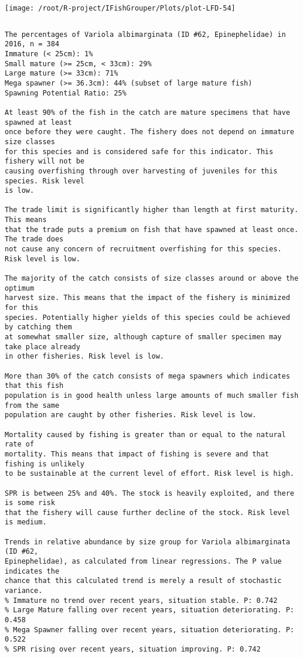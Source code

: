 \documentclass{report}\usepackage[]{graphicx}\usepackage[]{color}
\makeatletter
\def\maxwidth{ %
  \ifdim\Gin@nat@width>\linewidth
    \linewidth
  \else
    \Gin@nat@width
  \fi
}
\newenvironment{kframe}{%
 \def\at@end@of@kframe{}%
 \ifinner\ifhmode%
  \def\at@end@of@kframe{\end{minipage}}%
  \begin{minipage}{\columnwidth}%
 \fi\fi%
 \def\FrameCommand##1{\hskip\@totalleftmargin \hskip-\fboxsep
 \colorbox{shadecolor}{##1}\hskip-\fboxsep
     \hskip-\linewidth \hskip-\@totalleftmargin \hskip\columnwidth}%
 \MakeFramed {\advance\hsize-\width
   \@totalleftmargin\z@ \linewidth\hsize
   \@setminipage}}%
 {\par\unskip\endMakeFramed%
 \at@end@of@kframe}
\newenvironment{knitrout}{}{} %
\makeatother
\begin{document}
\begin{knitrout}
\texttt{[image: /root/R-project/IFishGrouper/Plots/plot-LFD-54]} 
\begin{kframe}\begin{verbatim}
\end{verbatim}
\end{kframe}
\clearpage
\newpage
\begin{kframe}\begin{verbatim}The percentages of Variola albimarginata (ID #62, Epinephelidae) in 2016, n = 384
Immature (< 25cm): 1%
Small mature (>= 25cm, < 33cm): 29%
Large mature (>= 33cm): 71%
Mega spawner (>= 36.3cm): 44% (subset of large mature fish)
Spawning Potential Ratio: 25%
 
At least 90% of the fish in the catch are mature specimens that have spawned at least
once before they were caught. The fishery does not depend on immature size classes
for this species and is considered safe for this indicator. This fishery will not be
causing overfishing through over harvesting of juveniles for this species. Risk level
is low.

The trade limit is significantly higher than length at first maturity.  This means
that the trade puts a premium on fish that have spawned at least once. The trade does
not cause any concern of recruitment overfishing for this species. Risk level is low.

The majority of the catch consists of size classes around or above the optimum
harvest size. This means that the impact of the fishery is minimized for this
species. Potentially higher yields of this species could be achieved by catching them
at somewhat smaller size, although capture of smaller specimen may take place already
in other fisheries. Risk level is low.

More than 30% of the catch consists of mega spawners which indicates that this fish
population is in good health unless large amounts of much smaller fish from the same
population are caught by other fisheries. Risk level is low.
 
Mortality caused by fishing is greater than or equal to the natural rate of
mortality. This means that impact of fishing is severe and that fishing is unlikely
to be sustainable at the current level of effort. Risk level is high.
 
SPR is between 25% and 40%. The stock is heavily exploited, and there is some risk
that the fishery will cause further decline of the stock. Risk level is medium.
 
Trends in relative abundance by size group for Variola albimarginata (ID #62,
Epinephelidae), as calculated from linear regressions. The P value indicates the
chance that this calculated trend is merely a result of stochastic variance.
% Immature no trend over recent years, situation stable. P: 0.742
% Large Mature falling over recent years, situation deteriorating. P: 0.458
% Mega Spawner falling over recent years, situation deteriorating. P: 0.522
% SPR rising over recent years, situation improving. P: 0.742
\end{verbatim}
\end{kframe}
\end{knitrout}
\end{document}
